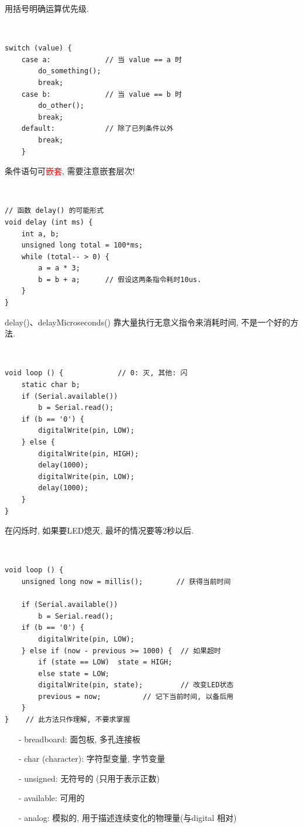 \documentclass[a4paper,11pt]{seminar}
\newcommand{\alert}[1]{\textcolor{red}{#1}}
\begin{document}
用括号明确运算优先级.
\endslide


~\ \vskip-6mm
\begin{lstlisting}[emph={do_something,do_other}]
    switch (value) {
    case a:             // 当 value == a 时
        do_something();
        break;
    case b:             // 当 value == b 时
        do_other();
        break;
    default:            // 除了已列条件以外
        break;
    }
\end{lstlisting}
条件语句可\alert{嵌套}, 需要注意嵌套层次! 
\endslide

~\ \vskip-6mm
\begin{lstlisting}
// 函数 delay() 的可能形式
void delay (int ms) {
    int a, b;
    unsigned long total = 100*ms;
    while (total-- > 0) {
        a = a * 3;       
        b = b + a;      // 假设这两条指令耗时10us.
    }
}
\end{lstlisting}
delay()、delayMicroseconds() 靠大量执行无意义指令来消耗时间,
不是一个好的方法.
\endslide

~\ \vskip-6mm
\begin{lstlisting}
void loop () {             // 0: 灭, 其他: 闪
    static char b;
    if (Serial.available())
        b = Serial.read();
    if (b == '0') {
        digitalWrite(pin, LOW);
    } else {
        digitalWrite(pin, HIGH);
        delay(1000);
        digitalWrite(pin, LOW);
        delay(1000);
    }
}
\end{lstlisting}

在闪烁时, 如果要LED熄灭, 最坏的情况要等2秒以后. 
\endslide

~\ \vskip-6mm
\begin{lstlisting}
void loop () {
    unsigned long now = millis();        // 获得当前时间

    if (Serial.available())
        b = Serial.read();
    if (b == '0') {
        digitalWrite(pin, LOW);
    } else if (now - previous >= 1000) {  // 如果超时
        if (state == LOW)  state = HIGH;
        else state = LOW;
        digitalWrite(pin, state);         // 改变LED状态
        previous = now;          // 记下当前时间, 以备后用
    }
}    // 此方法只作理解, 不要求掌握
\end{lstlisting}
\endslide


\begin{itemize}
    \item[-] breadboard: 面包板, 多孔连接板
    \item[-] char (character): 字符型变量, 字节变量
    \item[-] unsigned: 无符号的 (只用于表示正数)
    \item[-] available: 可用的
    \item[-] analog: 模拟的, 用于描述连续变化的物理量(与digital 相对)
\end{itemize}
\endslide
\end{document}
